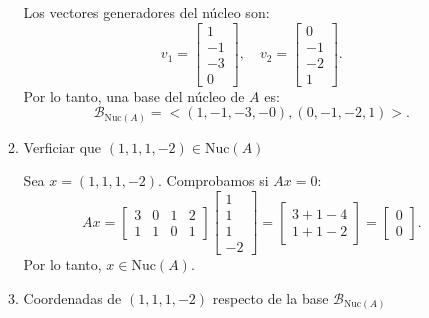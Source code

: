 \begin{enumerate}[label=\color{red}\textbf{\arabic*)}]
\begin{enumerate}[label=Paso \arabic*:]
            Los vectores generadores del núcleo son:  \[
            v_1=\begin{bmatrix} 
            1\\-1\\-3\\0 
            \end{bmatrix},\quad v_2=\begin{bmatrix} 
            0\\-1\\-2\\1 
            \end{bmatrix}.  
            \] 
            Por lo tanto, una base del núcleo de $A$ es:  \[
            \mathcal{B}_{\mathrm{Nuc}(A)}= <(1,-1,-3,-0),(0,-1,-2,1)>.
            \] 
        \item Verficiar que $(1,1,1,-2)\in \mathrm{Nuc}(A)$ 

            Sea $x=(1,1,1,-2)$. Comprobamos si  $Ax=0$:  \[
            Ax=\begin{bmatrix} 
                3 & 0 & 1 & 2\\
                1 & 1 & 0 & 1
            \end{bmatrix} \begin{bmatrix} 
            1\\1\\1\\-2 
            \end{bmatrix}=\begin{bmatrix} 
            3+1-4\\ 1+1-2 
            \end{bmatrix}=\begin{bmatrix} 
            0\\ 0 
            \end{bmatrix}.
            \] 
            Por lo tanto, $x \in \mathrm{Nuc}(A)$.
        \item Coordenadas de $(1,1,1,-2)$ respecto de la base $\mathcal{B}_{\mathrm{Nuc}(A)}$ 


\end{enumerate}
\end{enumerate}
